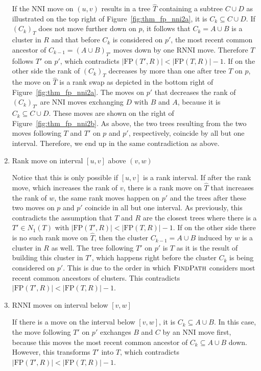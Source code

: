 \documentclass{amsart}
\newcommand{\rnni}{\mathrm{RNNI}}
\newcommand{\findpath}{\textsc{FindPath}}
\newcommand{\nni}{\mathrm{NNI}}
\newcommand{\fp}{\mathrm{FP}}
\begin{document}
\begin{enumerate}[{Case} (1).]
If the $\nni$ move on $(u,v)$ results in a tree $\hat T$ containing a subtree $C \cup D$ as illustrated on the top right of Figure~\ref{fig:thm_fp_nni2a}, it is $C_k \subseteq C \cup D$.
If $(C_k)_T$ does not move further down on $p$, it follows that $C_k = A \cup B$ is a cluster in $R$ and that before $C_k$ is considered on $p'$, the most recent common ancestor of $C_{k-1} = (A \cup B)_{T'}$ moves down by one $\rnni$ move.
Therefore $T$ follows $T'$ on $p'$, which contradicts $|\fp(T',R)| < |\fp(T,R)| - 1$.
If on the other side the rank of $(C_k)_T$ decreases by more than one after tree $T$ on $p$, the move on $\hat T$ is a rank swap as depicted in the bottom right of Figure~\ref{fig:thm_fp_nni2a}.
The moves on $p'$ that decreases the rank of $(C_k)_{T'}$ are $\nni$ moves exchanging $D$ with $B$ and $A$, because it is $C_k \subseteq C \cup D$.
These moves are shown on the right of Figure~\ref{fig:thm_fp_nni2b}.
As above, the two trees resulting from the two moves following $T$ and $T'$ on $p$ and $p'$, respectively, coincide by all but one interval.
Therefore, we end up in the same contradiction as above.

\item Rank move on interval $[u,v]$ above $(v,w)$

Notice that this is only possible if $[u,v]$ is a rank interval.
If after the rank move, which increases the rank of $v$, there is a rank move on $\hat T$ that increases the rank of $w$, the same rank moves happen on $p'$ and the trees after these two moves on $p$ and $p'$ coincide in all but one interval.
As previously, this contradicts the assumption that $T$ and $R$ are the closest trees where there is a $T' \in N_1(T)$ with $|\fp(T',R)| < |\fp(T,R)| - 1$.
If on the other side there is no such rank move on $\hat T$, then the cluster $C_{k-1} = A \cup B$ induced by $w$ is a cluster in $R$ as well.
The tree following $T'$ on $p'$ is $T$ as it is the result of building this cluster in $T'$, which happens right before the cluster $C_k$ is being considered on $p'$.
This is due to the order in which $\findpath$ considers most recent common ancestors of clusters.
This contradicts $|\fp(T',R)| < |\fp(T,R)| - 1$.

\item $\rnni$ moves on interval below $[v,w]$

If there is a move on the interval below $[v,w]$, it is $C_k \subseteq A \cup B$.
In this case, the move following $T'$ on $p'$ exchanges $B$ and $C$ by an $\nni$ move first, because this moves the most recent common ancestor of $C_k \subseteq A \cup B$ down.
However, this transforms $T'$ into $T$, which contradicts $|\fp(T',R)| < |\fp(T,R)| - 1$.
\end{enumerate}
\end{document}
